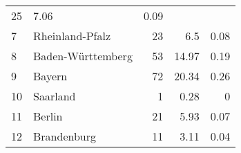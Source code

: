 \begin{longtable}{lXrrr}
       \num{25} &
       \num[round-mode=places,round-precision=2]{7.06} &
         \num[round-mode=places,round-precision=2]{0.09} \\

     7 &
     \multicolumn{1}{X}{ Rheinland-Pfalz   } &


       \num{23} &
       \num[round-mode=places,round-precision=2]{6.5} &
         \num[round-mode=places,round-precision=2]{0.08} \\

     8 &
     \multicolumn{1}{X}{ Baden-Württemberg   } &


       \num{53} &
       \num[round-mode=places,round-precision=2]{14.97} &
         \num[round-mode=places,round-precision=2]{0.19} \\

     9 &
     \multicolumn{1}{X}{ Bayern   } &


       \num{72} &
       \num[round-mode=places,round-precision=2]{20.34} &
         \num[round-mode=places,round-precision=2]{0.26} \\

     10 &
     \multicolumn{1}{X}{ Saarland   } &


       \num{1} &
       \num[round-mode=places,round-precision=2]{0.28} &
         \num[round-mode=places,round-precision=2]{0} \\

     11 &
     \multicolumn{1}{X}{ Berlin   } &


       \num{21} &
       \num[round-mode=places,round-precision=2]{5.93} &
         \num[round-mode=places,round-precision=2]{0.07} \\

     12 &
     \multicolumn{1}{X}{ Brandenburg   } &


       \num{11} &
       \num[round-mode=places,round-precision=2]{3.11} &
         \num[round-mode=places,round-precision=2]{0.04} \\


\end{longtable}
